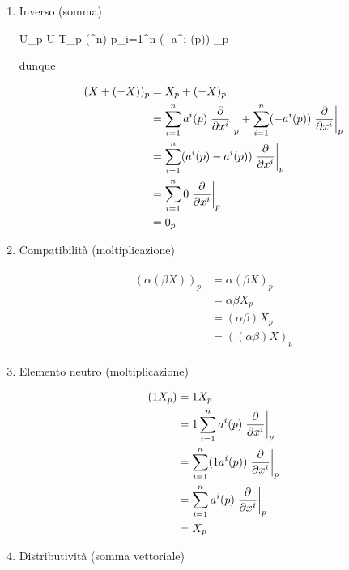 \begin{enumerate}
	\item Inverso (somma)
	
			{U}{\bigsqcup_{p \in U} T_{p} (\R^{n})}
			{p}{\sum_{i=1}^{n} (- a^{i} (p)) _{p}}
		
		dunque
		
		\begin{align}
			\begin{split}
				(X + (- X))_{p} &= X_{p} + (- X)_{p}\\
				&= \sum_{i=1}^{n} a^{i} (p) \eval{ \pdv{x^{i}} }_{p} + \sum_{i=1}^{n} (- a^{i} (p)) \eval{ \pdv{x^{i}} }_{p}\\
				&= \sum_{i=1}^{n} (a^{i} (p) - a^{i} (p)) \eval{ \pdv{x^{i}} }_{p}\\
				&= \sum_{i=1}^{n} 0 \eval{ \pdv{x^{i}} }_{p}\\
				&= 0_{p}
			\end{split}
		\end{align}
	
	\item Compatibilità (moltiplicazione)
	
		\begin{align}
			\begin{split}
				(\alpha (\beta X))_{p} &= \alpha (\beta X)_{p}\\
				&= \alpha \beta X_{p}\\
				&= (\alpha \beta) X_{p}\\
				&= ((\alpha \beta) X)_{p}
			\end{split}
		\end{align}
	
	\item Elemento neutro (moltiplicazione)
	
		\begin{align}
			\begin{split}
				(1 X_{p}) &= 1 X_{p}\\
				&= 1 \sum_{i=1}^{n} a^{i} (p) \eval{ \pdv{x^{i}} }_{p}\\
				&= \sum_{i=1}^{n} (1 a^{i} (p)) \eval{ \pdv{x^{i}} }_{p}\\
				&= \sum_{i=1}^{n} a^{i} (p) \eval{ \pdv{x^{i}} }_{p}\\
				&= X_{p}
			\end{split}
		\end{align}
	
	\item Distributività (somma vettoriale)
	

\end{enumerate}
